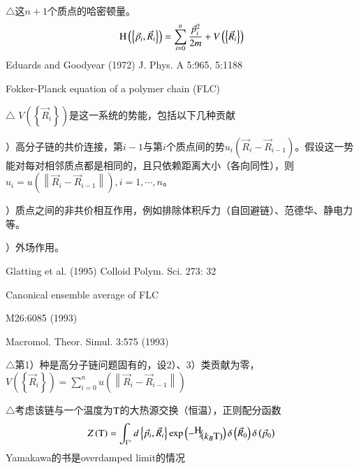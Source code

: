 \documentclass{article} %
\begin{document}
\noindent $\mathrm{\triangle}$这$n+1$个质点的哈密顿量。
\[{\rm H} \left(\left\{\vec{p}_{i} ,\vec{R}_{i} \right\}\right)=\sum _{i=0}^{n}\frac{\vec{p}_{i}^{2} }{2m} +V\left(\left\{\vec{R}_{i} \right\}\right) \] 
Eduards and Goodyear (1972) J. Phys. A 5:965, 5:1188

\noindent Fokker-Planck equation of a polymer chain (FLC)

\noindent $\mathrm{\triangle}$ $V\left(\left\{\vec{R}_{i} \right\}\right)$是这一系统的势能，包括以下几种贡献

）高分子链的共价连接，第$i-1$与第$i$个质点间的势$u_{i} \left(\vec{R}_{i} -\vec{R}_{i-1} \right)$。假设这一势能对每对相邻质点都是相同的，且只依赖距离大小（各向同性），则$u_{i} =u\left(\left\| \vec{R}_{i} -\vec{R}_{i-1} \right\| \right),i=1,\cdots ,n$。

）质点之间的非共价相互作用，例如排除体积斥力（自回避链）、范德华、静电力等。

）外场作用。

\noindent Glatting et al. (1995) Colloid Polym. Sci. 273: 32

\noindent Canonical ensemble average of FLC

\noindent M26:6085 (1993)

\noindent Macromol. Theor. Simul. 3:575 (1993)

\noindent $\mathrm{\triangle}$第1）种是高分子链问题固有的，设2）、3）类贡献为零，$V\left(\left\{\vec{R}_{i} \right\}\right)=\sum _{i=0}^{n}u\left(\left\| \vec{R}_{i} -\vec{R}_{i-1} \right\| \right) $

\noindent $\mathrm{\triangle}$考虑该链与一个温度为${\rm T} $的大热源交换（恒温），正则配分函数
\[Z\left({\rm T} \right)=\int _{\Gamma '}d\left\{\vec{p}_{i} ,\vec{R}_{i} \right\} \exp \left(-{\raise0.7ex\hbox{$ {\rm H}  $}\!\mathord{\left/ {\vphantom {{\rm H}  \left(k_{B} {\rm T} \right)}} \right. \kern-\nulldelimiterspace}\!\lower0.7ex\hbox{$ \left(k_{B} {\rm T} \right) $}} \right)\delta \left(\vec{R}_{0} \right)\delta \left(\vec{p}_{0} \right)\] 
Yamakawa的书是overdamped limit的情况
\end{document}
